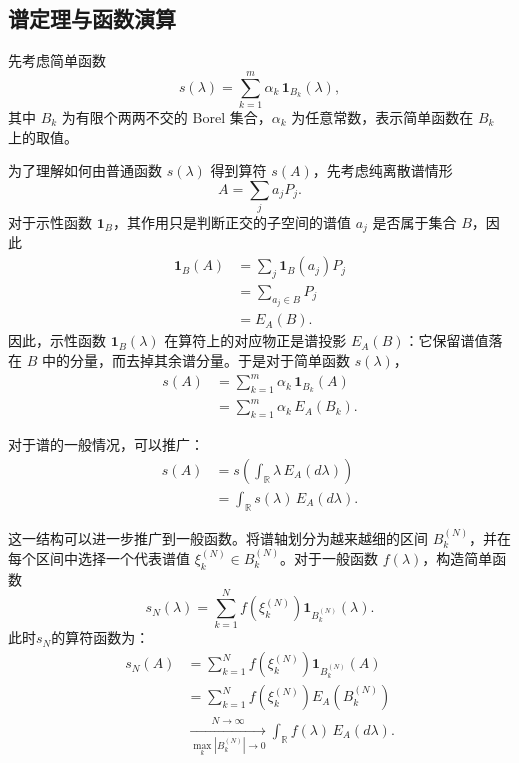 \documentclass[UTF8,a4paper,11pt,openany]{ctexbook}
\begin{document}
\subsection{谱定理与函数演算}

先考虑简单函数
\begin{equation}
    s(\lambda)
    =
    \sum_{k=1}^{m}
    \alpha_k\,\mathbf 1_{B_k}(\lambda),
\end{equation}
其中 $B_k$ 为有限个两两不交的 Borel 集合，$\alpha_k$ 为任意常数，表示简单函数在 $B_k$ 上的取值。

为了理解如何由普通函数 $s(\lambda)$ 得到算符 $s(A)$，先考虑纯离散谱情形
\[
A=\sum_j a_jP_j.
\]
对于示性函数 $\mathbf 1_B$，其作用只是判断正交的子空间的谱值 $a_j$ 是否属于集合 $B$，因此
\begin{align}
    \mathbf 1_B(A)
    &=
    \sum_j \mathbf 1_B(a_j)P_j
    \nonumber\\
    &=
    \sum_{a_j\in B}P_j
    \nonumber\\
    &=
    E_A(B).
\end{align}
因此，示性函数 $\mathbf 1_B(\lambda)$ 在算符上的对应物正是谱投影 $E_A(B)$：它保留谱值落在 $B$ 中的分量，而去掉其余谱分量。于是对于简单函数 $s(\lambda)$，
\begin{align}
    s(A)
    &=
    \sum_{k=1}^{m}
    \alpha_k\,\mathbf 1_{B_k}(A)
    \nonumber\\
    &=
    \sum_{k=1}^{m}
    \alpha_k\,E_A(B_k).
\end{align}

对于谱的一般情况，可以推广：
\begin{align}
    s(A)
    &=
    s(\int_{\mathbb R}
\lambda\,E_A(d\lambda))\\
    &=
    \int_{\mathbb R}
    s(\lambda)\,E_A(d\lambda).
\end{align}

这一结构可以进一步推广到一般函数。将谱轴划分为越来越细的区间
$B_k^{(N)}$，并在每个区间中选择一个代表谱值
$\xi_k^{(N)}\in B_k^{(N)}$。对于一般函数 $f(\lambda)$，构造简单函数
\begin{equation}
    s_N(\lambda)
    =
    \sum_{k=1}^{N}
    f\!\left(\xi_k^{(N)}\right)
    \mathbf 1_{B_k^{(N)}}(\lambda).
\end{equation}
此时$s_N$的算符函数为：
\begin{align}
    s_N(A)
    &=
    \sum_{k=1}^{N}
    f\!\left(\xi_k^{(N)}\right)
    \mathbf 1_{B_k^{(N)}}(A)
    \nonumber\\
    &=
    \sum_{k=1}^{N}
    f\!\left(\xi_k^{(N)}\right)
    E_A\!\left(B_k^{(N)}\right)
    \nonumber\\
    &\xrightarrow[\max_k|B_k^{(N)}|\to0]{N\to\infty}
    \int_{\mathbb R}
    f(\lambda)\,E_A(d\lambda).
\end{align}
\end{document}
